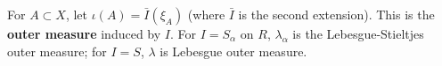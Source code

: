 For $A \subset X$, let $\iota(A) = \bar{I}(\xi_A)$ (where $\bar{I}$ is the second extension). This is the \textbf{outer measure} induced by $I$. For $I = S_{\alpha}$ on $R$, $\lambda_{\alpha}$ is the Lebesgue-Stieltjes outer measure; for $I = S$, $\lambda$ is Lebesgue outer measure.
